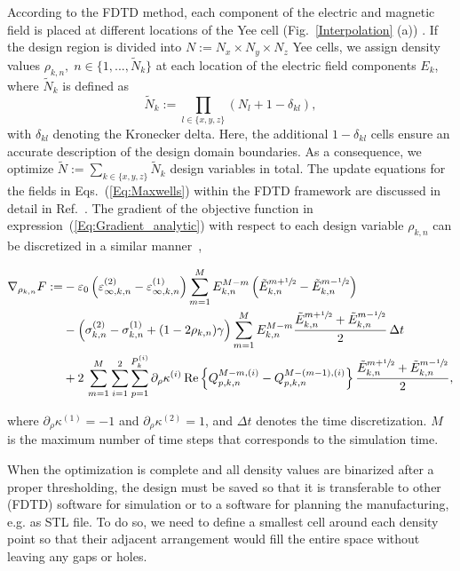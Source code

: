 \documentclass[aps,prl,twocolumn,superscriptaddress,longbibliography]{revtex4-1}
\begin{document}
According to the FDTD method, each component of the electric and magnetic field is placed at different locations of the Yee cell (Fig.~\ref{Interpolation} (a)) \cite{Yee}. If the design region is divided into $N:= N_{x} \times N_{y}\times N_{z}$ Yee cells, we assign density values
$\rho_{k,n}, \; n\in \{1, ..., \tilde{N}_k\}$ at each location of the electric field components $E_k$, where $\tilde{N}_k$ is defined as
\begin{equation}
\tilde{N}_k:= \prod_{l\in\{x,y,z\}} (N_{l} + 1 - \delta_{kl}),  
\end{equation} 
with $\delta_{kl}$ denoting the Kronecker delta. Here, the additional $1 - \delta_{kl}$ cells ensure an accurate description of the design domain boundaries. As a consequence, we optimize $\tilde{N}:= \sum_{k\in\{x,y,z\}} \tilde{N}_k$ design variables in total.\newline\newline\newline\newline\newline
The update equations for the fields in Eqs.~(\ref{Eq:Maxwells}) within the FDTD framework are discussed in detail in Ref.~\cite{material}. The gradient of the objective function in expression~(\ref{Eq:Gradient_analytic}) with respect to each design variable $\rho_{k,n}$ can be discretized in a similar manner~\cite{Hassan15Time},
\begin{widetext}
\begin{equation}\label{Eq:Gradient_FDTD}
\begin{split}
\nabla_{\rho_{k,n}}F:=&-\varepsilon_{0}\left(\varepsilon_{\infty, k,n}^{(2)} - \varepsilon_{\infty, k,n}^{(1)}\right)\sum^{M}_{m=1}E^{M-m}_{k,n}\left(\tilde{E}^{m + \sfrac{1}{2}}_{k,n} - \tilde{E}^{m - \sfrac{1}{2}}_{k,n}\right) \\
& -\left(\sigma_{k,n}^{(2)} - \sigma_{k,n}^{(1)} + (1-2\rho_{k,n})\gamma\right)\sum^{M}_{m=1}E^{M-m}_{k,n}\frac{\tilde{E}^{m + \sfrac{1}{2}}_{k,n} + \tilde{E}^{m - \sfrac{1}{2}}_{k,n}}{2}\,\Delta t \\
& +2\,\sum^{M}_{m=1}\sum^{2}_{i=1}\sum_{p=1}^{P_{k}^{(i)}}\partial_{\rho}\kappa^{(i)}\Re\left\{Q^{M-m, (i)}_{p, k, n} - Q^{M-(m-1), (i)}_{p, k, n}\right\}\frac{\tilde{E}^{m + \sfrac{1}{2}}_{k,n} + \tilde{E}^{m - \sfrac{1}{2}}_{k,n}}{2},
\end{split}
\end{equation}
\end{widetext}

where $\partial_{\rho}\kappa^{(1)} = -1$ and $\partial_{\rho}\kappa^{(2)} = 1$, and $\Delta t$ denotes the time discretization. $M$ is the maximum number of time steps that corresponds to the simulation time. \par
When the optimization is complete and all density values are binarized after a proper thresholding, the design must be saved so that it is transferable to other (FDTD) software for simulation or to a software for planning the manufacturing, e.g. as STL file. To do so, we need to define a smallest cell around each density point so that their adjacent arrangement would fill the entire space without leaving any gaps or holes. 
\end{document}
